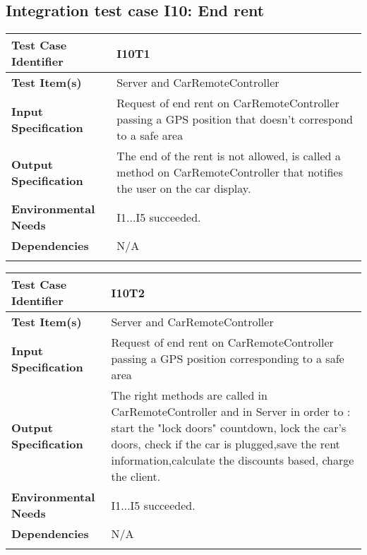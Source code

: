 %
\subsection{Integration test case I10: End rent}

\begin{center}
\begin{tabular*}
{\textwidth}
{l p{10.5cm}}

\hline
\textbf{Test Case Identifier} & I10T1 \\
\hline
\textbf{Test Item(s)} & Server and CarRemoteController \\
\hline
\textbf{Input Specification} & Request of end rent on CarRemoteController passing a GPS position that doesn't correspond to a safe area \\
\hline
\textbf{Output Specification} & The end of the rent is not allowed, is called a method on CarRemoteController that notifies the user on the car display.\\
\hline
\textbf{Environmental Needs} & I1...I5 succeeded. \\
\hline
\textbf{Dependencies} & N/A \\
\hline
\newline
\newline

\end{tabular*}
\end{center}

\begin{center}
\begin{tabular*}
{\textwidth}
{l p{10.5cm}}

\hline
\textbf{Test Case Identifier} & I10T2 \\
\hline
\textbf{Test Item(s)} & Server and CarRemoteController \\
\hline
\textbf{Input Specification} & Request of end rent on CarRemoteController passing a GPS position corresponding to a safe area  \\
\hline
\textbf{Output Specification} & The right methods are called in CarRemoteController and in Server in order to : start the "lock doors" countdown, lock the car's doors, check if the car is plugged,save the rent information,calculate the discounts based, charge the client. \\
\hline
\textbf{Environmental Needs} &  I1...I5 succeeded.\\
\hline
\textbf{Dependencies} & N/A\\
\hline
\newline
\newline

\end{tabular*}
\end{center}

